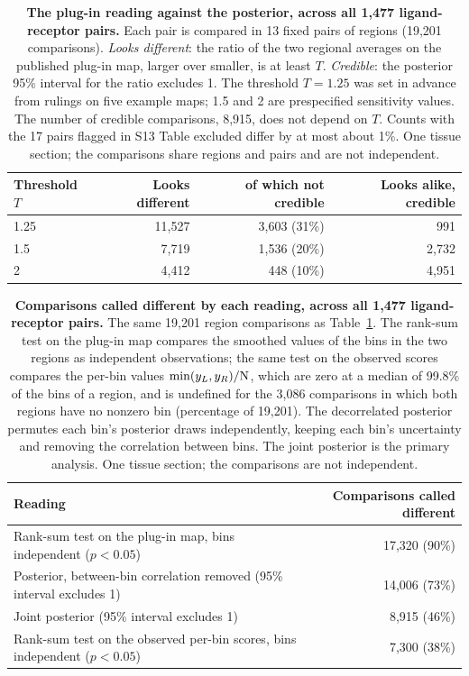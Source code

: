 \documentclass[10pt,letterpaper]{article}
\begin{document}
\begin{table}[!ht]
\centering
\caption{{\bf The plug-in reading against the posterior, across all 1,477 ligand-receptor pairs.} Each pair is compared in 13 fixed pairs of regions (19,201 comparisons). \textit{Looks different}: the ratio of the two regional averages on the published plug-in map, larger over smaller, is at least $T$. \textit{Credible}: the posterior 95\% interval for the ratio excludes 1. The threshold $T = 1.25$ was set in advance from rulings on five example maps; 1.5 and 2 are prespecified sensitivity values. The number of credible comparisons, 8,915, does not depend on $T$. Counts with the 17 pairs flagged in S13 Table excluded differ by at most about 1\%. One tissue section; the comparisons share regions and pairs and are not independent.}
\label{tab:systematic}
\begin{tabular}{|l|rrr|}
  \hline
  Threshold $T$ & Looks different & of which not credible & Looks alike, credible \\
  \hline
  1.25 & 11,527 & 3,603 (31\%) & 991 \\
  1.5  & 7,719 & 1,536 (20\%) & 2,732 \\
  2    & 4,412 & 448 (10\%) & 4,951 \\
  \hline
\end{tabular}
\end{table}

\begin{table}[!ht]
\centering
\caption{{\bf Comparisons called different by each reading, across all 1,477 ligand-receptor pairs.} The same 19,201 region comparisons as Table~\ref{tab:systematic}. The rank-sum test on the plug-in map compares the smoothed values of the bins in the two regions as independent observations; the same test on the observed scores compares the per-bin values $\min(y_L, y_R)/\mbox{N}$, which are zero at a median of 99.8\% of the bins of a region, and is undefined for the 3,086 comparisons in which both regions have no nonzero bin (percentage of 19,201). The decorrelated posterior permutes each bin's posterior draws independently, keeping each bin's uncertainty and removing the correlation between bins. The joint posterior is the primary analysis. One tissue section; the comparisons are not independent.}
\label{tab:readings}
\begin{tabular}{|l|r|}
  \hline
  Reading & Comparisons called different \\
  \hline
  Rank-sum test on the plug-in map, bins independent ($p<0.05$) & 17,320 (90\%) \\
  Posterior, between-bin correlation removed (95\% interval excludes 1) & 14,006 (73\%) \\
  Joint posterior (95\% interval excludes 1) & 8,915 (46\%) \\
  Rank-sum test on the observed per-bin scores, bins independent ($p<0.05$) & 7,300 (38\%) \\
  \hline
\end{tabular}
\end{table}
\end{document}
